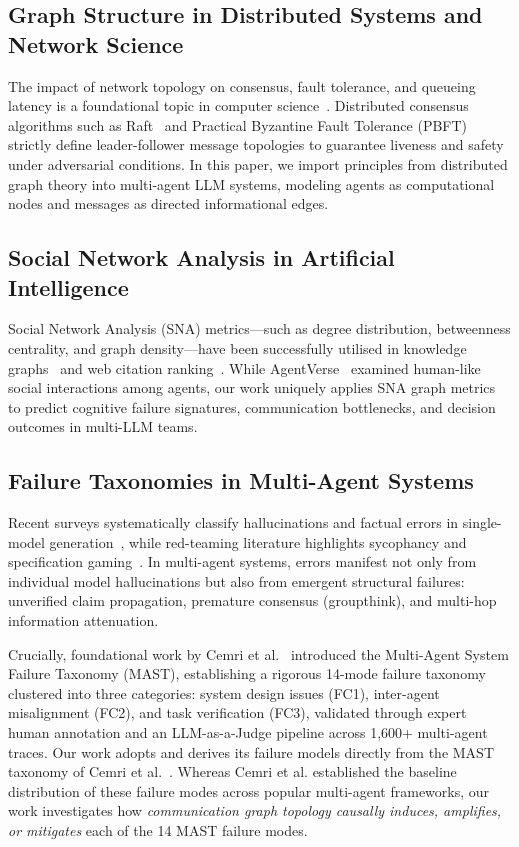 \documentclass[conference]{IEEEtran}
\newcommand{\fc}[1]{\textsf{FC#1}}  %
\begin{document}
\subsection{Graph Structure in Distributed Systems and Network Science}
The impact of network topology on consensus, fault tolerance, and queueing latency is a foundational topic in computer science~\cite{kleinrock1975queueing}. Distributed consensus algorithms such as Raft~\cite{ongaro2014search} and Practical Byzantine Fault Tolerance (PBFT)~\cite{castro1999practical} strictly define leader-follower message topologies to guarantee liveness and safety under adversarial conditions. In this paper, we import principles from distributed graph theory into multi-agent LLM systems, modeling agents as computational nodes and messages as directed informational edges.

\subsection{Social Network Analysis in Artificial Intelligence}
Social Network Analysis (SNA) metrics—such as degree distribution, betweenness centrality, and graph density—have been successfully utilised in knowledge graphs~\cite{scarselli2009graph} and web citation ranking~\cite{page1999pagerank}. While AgentVerse~\cite{chen2023agentverse} examined human-like social interactions among agents, our work uniquely applies SNA graph metrics to predict cognitive failure signatures, communication bottlenecks, and decision outcomes in multi-LLM teams.

\subsection{Failure Taxonomies in Multi-Agent Systems}
Recent surveys systematically classify hallucinations and factual errors in single-model generation~\cite{ji2023survey}, while red-teaming literature highlights sycophancy and specification gaming~\cite{perez2022discovering}. In multi-agent systems, errors manifest not only from individual model hallucinations but also from emergent structural failures: unverified claim propagation, premature consensus (groupthink), and multi-hop information attenuation.

Crucially, foundational work by Cemri et al.~\cite{cemri2025why} introduced the Multi-Agent System Failure Taxonomy (MAST), establishing a rigorous 14-mode failure taxonomy clustered into three categories: system design issues (\fc{1}), inter-agent misalignment (\fc{2}), and task verification (\fc{3}), validated through expert human annotation and an LLM-as-a-Judge pipeline across 1,600+ multi-agent traces. Our work adopts and derives its failure models directly from the MAST taxonomy of Cemri et al.~\cite{cemri2025why}. Whereas Cemri et al. established the baseline distribution of these failure modes across popular multi-agent frameworks, our work investigates how \emph{communication graph topology causally induces, amplifies, or mitigates} each of the 14 MAST failure modes.
\end{document}
